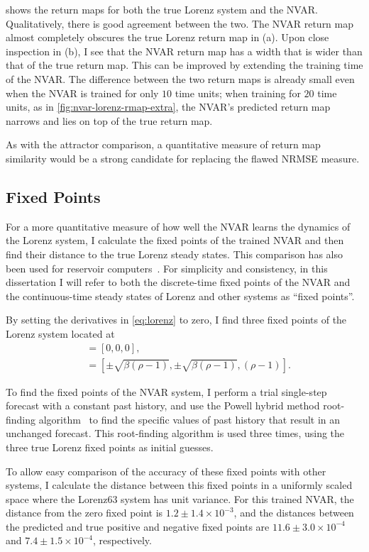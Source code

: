  shows the return maps for both the true
Lorenz system and the NVAR. Qualitatively, there is good agreement
between the two. The NVAR return map almost completely obscures the
true Lorenz return map in (a). Upon close inspection in (b), I see
that the NVAR return map has a width that is wider than that of the
true return map. This can be improved by extending the training time
of the NVAR. The difference between the two return maps is already
small even when the NVAR is trained for only $10$ time units; when
training for $20$ time units, as in \cref{fig:nvar-lorenz-rmap-extra},
the NVAR's predicted return map narrows and lies on top of the true
return map.

As with the attractor comparison, a quantitative measure of return map
similarity would be a strong candidate for replacing the flawed NRMSE
measure.

\subsection{Fixed Points}

For a more quantitative measure of how well the NVAR learns the
dynamics of the Lorenz system, I calculate the fixed points of the
trained NVAR and then find their distance to the true Lorenz steady
states. This comparison has also been used for reservoir computers~\cite{krishnagopal2019}. For simplicity and consistency, in this dissertation I will
refer to both the discrete-time fixed points of the NVAR and the
continuous-time steady states of Lorenz and other systems as ``fixed
points''.

By setting the derivatives in \cref{eq:lorenz} to zero, I
find three fixed points of the Lorenz system located at
\begin{align}
  [x, y, z] &= [0, 0, 0], \\
            &= [\pm \sqrt{\beta(\rho - 1)}, \pm \sqrt{\beta(\rho - 1)}, (\rho - 1)].
\end{align}

To find the fixed points of the NVAR system, I perform a trial
single-step forecast with a constant past history, and use the Powell hybrid method
root-finding algorithm~\cite{more1980,powell1970} to find the specific values of past history
that result in an unchanged forecast. This root-finding algorithm is
used three times, using the three true Lorenz fixed points as initial
guesses.

To allow easy comparison of the accuracy of these fixed points with
other systems, I calculate the distance between this fixed points in
a uniformly scaled space where the Lorenz63 system has unit
variance. For this trained NVAR, the distance from the zero fixed point
is $1.2\pm1.4\times10^{-3}$, and the distances between the predicted
and true positive and negative fixed points are
$11.6\pm3.0\times10^{-4}$ and $7.4\pm1.5\times10^{-4}$, respectively.

